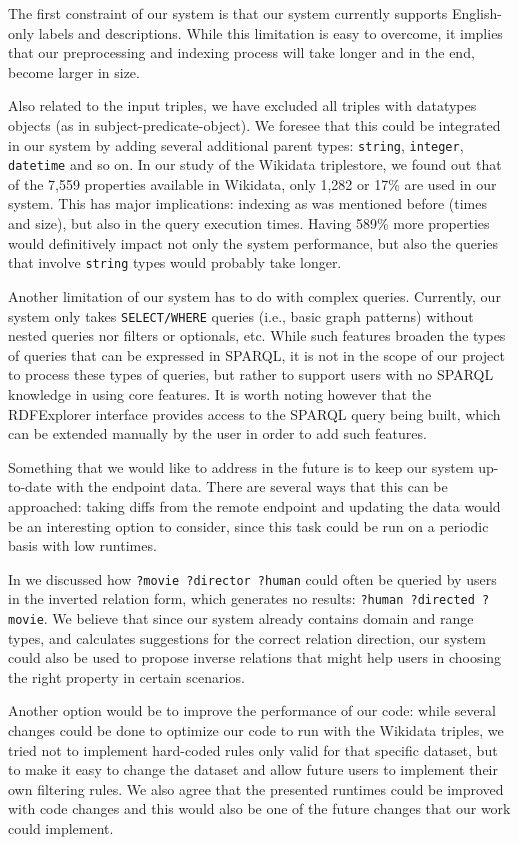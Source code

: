 The first constraint of our system is that our system currently supports English-only labels and descriptions. While this limitation is easy to overcome, it implies that our preprocessing and indexing process will take longer and in the end, become larger in size. 

Also related to the input triples, we have excluded all triples with datatypes objects (as in subject-predicate-object). We foresee that this could be integrated in our system by adding several additional parent types: \texttt{string}, \texttt{integer}, \texttt{datetime} and so on. In our study of the Wikidata triplestore, we found out that of the 7,559 properties available in Wikidata, only 1,282 or 17\% are used in our system. This has major implications: indexing as was mentioned before (times and size), but also in the query execution times. Having 589\% more properties would definitively impact not only the system performance, but also the queries that involve \texttt{string} types would probably take longer.

Another limitation of our system has to do with complex queries. Currently, our system only takes \texttt{SELECT/WHERE} queries (i.e., basic graph patterns) without nested queries nor filters or optionals, etc. While such features broaden the types of queries that can be expressed in SPARQL, it is not in the scope of our project to process these types of queries, but rather to support users with no SPARQL knowledge in using core features. It is worth noting however that the RDFExplorer interface provides access to the SPARQL query being built, which can be extended manually by the user in order to add such features.

Something that we would like to address in the future is to keep our system up-to-date with the endpoint data. There are several ways that this can be approached: taking diffs from the remote endpoint and updating the data would be an interesting option to consider, since this task could be run on a periodic basis with low runtimes. 

In  we discussed how \texttt{?movie ?director ?human} could often be queried by users in the inverted relation form, which generates no results: \texttt{?human ?directed ?movie}. We believe that since our system already contains domain and range types, and calculates suggestions for the correct relation direction, our system could also be used to propose inverse relations that might help users in choosing the right property in certain scenarios.

Another option would be to improve the performance of our code: while several changes could be done to optimize our code to run with the Wikidata triples, we tried not to implement hard-coded rules only valid for that specific dataset, but to make it easy to change the dataset and allow future users to implement their own filtering rules. We also agree that the presented runtimes could be improved with code changes and this would also be one of the future changes that our work could implement.
